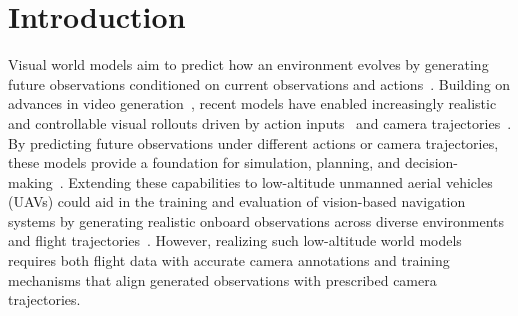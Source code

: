 \section{Introduction}
\label{sec:intro}


Visual world models aim to predict how an environment evolves by generating future observations conditioned on current observations and actions~\cite{ha2018worldmodels,yang2024learninginteractiverealworldsimulators,hu2023gaia1generativeworldmodel}.
%
Building on advances in video generation~\cite{ho2022videodiffusionmodels,blattmann2023stablevideodiffusionscaling,yang2025cogvideoxtexttovideodiffusionmodels,kong2025hunyuanvideosystematicframeworklarge,wan2025wanopenadvancedlargescale}, recent models have enabled increasingly realistic and controllable visual rollouts driven by action inputs~\cite{bruce2024geniegenerativeinteractiveenvironments,valevski2025diffusionmodelsrealtimegame,he2026matrixgame20opensourcerealtime,zhang2026worldplay2extendingrealtimeinteractive,zhou2026astronexworld10realtimeinteractive} and camera trajectories~\cite{he2025cameractrlenablingcameracontrol,wang2024motionctrlunifiedflexiblemotion,xu2024camcocameracontrollable3dconsistentimagetovideo,zhang2026unifiedcamerapositionalencoding,huang2026solarwmopendatascalable,zhu2026sanawmefficientminutescaleworld}.
%
By predicting future observations under different actions or camera trajectories, these models provide a foundation for simulation, planning, and decision-making~\cite{yang2024learninginteractiverealworldsimulators,alonso2024diffusionworldmodelingvisual,gao2026dreamdojogeneralistrobotworld}.
%
Extending these capabilities to low-altitude unmanned aerial vehicles (UAVs) could aid in the training and evaluation of vision-based navigation systems by generating realistic onboard observations across diverse environments and flight trajectories~\cite{zhao2025airscapeaerialgenerativeworld,zhang2026aerialworldmodellonghorizon}.
%
However, realizing such low-altitude world models requires both flight data with accurate camera annotations and training mechanisms that align generated observations with prescribed camera trajectories.

